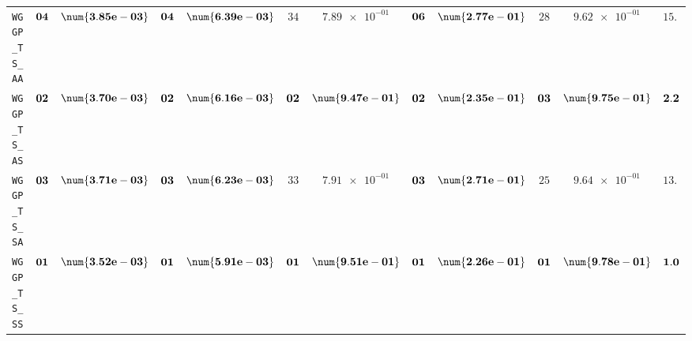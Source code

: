 \begin{xltabular}{\textwidth}{l||cC|cC|cC|cC|cC||c}
	\texttt{WGGP\_TS\_AA} & $\bf 04$ & $\bf \num{3.85e-03}$ & $\bf 04$ & $\bf \num{6.39e-03}$ & $ 34$ & $ \num{7.89e-01}$ & $\bf 06$ & $\bf \num{2.77e-01}$ & $ 28$ & $ \num{9.62e-01}$ & $ 15.2$  \\
	\texttt{WGGP\_TS\_AS} & $\bf 02$ & $\bf \num{3.70e-03}$ & $\bf 02$ & $\bf \num{6.16e-03}$ & $\bf 02$ & $\bf \num{9.47e-01}$ & $\bf 02$ & $\bf \num{2.35e-01}$ & $\bf 03$ & $\bf \num{9.75e-01}$ & $\bf 2.2$  \\
	\texttt{WGGP\_TS\_SA} & $\bf 03$ & $\bf \num{3.71e-03}$ & $\bf 03$ & $\bf \num{6.23e-03}$ & $ 33$ & $ \num{7.91e-01}$ & $\bf 03$ & $\bf \num{2.71e-01}$ & $ 25$ & $ \num{9.64e-01}$ & $ 13.4$  \\
	\texttt{WGGP\_TS\_SS} & $\bf 01$ & $\bf \num{3.52e-03}$ & $\bf 01$ & $\bf \num{5.91e-03}$ & $\bf 01$ & $\bf \num{9.51e-01}$ & $\bf 01$ & $\bf \num{2.26e-01}$ & $\bf 01$ & $\bf \num{9.78e-01}$ & $\bf 1.0$  \\
\end{xltabular}

